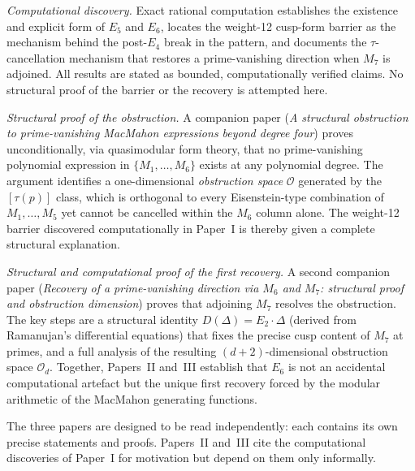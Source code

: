 \documentclass[11pt]{article}
\begin{document}
\begin{description}[leftmargin=2em,labelwidth=1.8em,labelsep=0.2em]
\item[\textbf{Paper I} (this paper).]\emph{Computational discovery.}
Exact rational computation establishes the existence and explicit form of $E_5$ and $E_6$,
locates the weight-12 cusp-form barrier as the mechanism behind the post-$E_4$ break in
the pattern, and documents the $\tau$-cancellation mechanism that restores a prime-vanishing
direction when $M_7$ is adjoined.
All results are stated as bounded, computationally verified claims.
No structural proof of the barrier or the recovery is attempted here.

\item[\textbf{Paper II}.]\emph{Structural proof of the obstruction.}
A companion paper (\emph{A structural obstruction to prime-vanishing MacMahon expressions
beyond degree four}) proves unconditionally, via quasimodular form theory, that no
prime-vanishing polynomial expression in $\{M_1,\dots,M_6\}$ exists at any polynomial
degree.
The argument identifies a one-dimensional \emph{obstruction space} $\mathcal{O}$
generated by the $[\tau(p)]$ class, which is orthogonal to every Eisenstein-type
combination of $M_1,\dots,M_5$ yet cannot be cancelled within the $M_6$ column alone.
The weight-12 barrier discovered computationally in Paper~I is thereby given a complete
structural explanation.

\item[\textbf{Paper III}.]\emph{Structural and computational proof of the first recovery.}
A second companion paper (\emph{Recovery of a prime-vanishing direction via $M_6$ and $M_7$:
structural proof and obstruction dimension}) proves that adjoining $M_7$ resolves the
obstruction.
The key steps are a structural identity $D(\Delta)=E_2\cdot\Delta$ (derived from
Ramanujan's differential equations) that fixes the precise cusp content of $M_7$ at primes,
and a full analysis of the resulting $(d{+}2)$-dimensional obstruction space $\mathcal{O}_d$.
Together, Papers~II and~III establish that $E_6$ is not an accidental computational artefact
but the unique first recovery forced by the modular arithmetic of the MacMahon generating
functions.
\end{description}

The three papers are designed to be read independently: each contains its own precise
statements and proofs.
Papers~II and~III cite the computational discoveries of Paper~I for motivation but depend on
them only informally.
\end{document}
